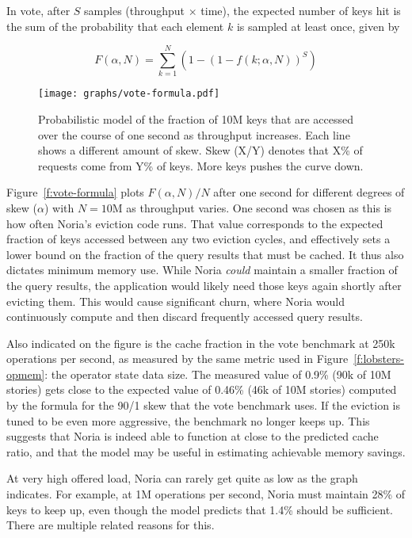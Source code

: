 In vote, after $S$ samples (throughput $\times$ time), the expected number of
keys hit is the sum of the probability that each element $k$ is sampled at least
once, given by

\begin{displaymath}
  F(\alpha,N)={\sum \limits _{k=1}^{N} \left(1 - \left(1 - f(k; \alpha, N)\right)^{S}\right)}
\end{displaymath}

\begin{figure}[h]
  \centering
  \texttt{[image: graphs/vote-formula.pdf]}
  \caption{Probabilistic model of the fraction of 10M keys that are accessed
  over the course of one second as throughput increases. Each line shows a
  different amount of skew. Skew (X/Y) denotes that X\% of requests come from
  Y\% of keys. More keys pushes the curve down.}
  \label{f:vote-formula}
\end{figure}

Figure~\vref{f:vote-formula} plots $F(\alpha, N)/N$ after one second for
different degrees of skew ($\alpha$) with $N=10\text{M}$ as throughput varies.
One second was chosen as this is how often Noria's eviction code runs. That
value corresponds to the expected fraction of keys accessed between any two
eviction cycles, and effectively sets a lower bound on the fraction of the query
results that must be cached. It thus also dictates minimum memory use. While
Noria \emph{could} maintain a smaller fraction of the query results, the
application would likely need those keys again shortly after evicting them. This
would cause significant churn, where Noria would continuously compute and then
discard frequently accessed query results.

Also indicated on the figure is the cache fraction in the vote benchmark at 250k
operations per second, as measured by the same metric used in
Figure~\ref{f:lobsters-opmem}: the operator state data size. The measured value
of 0.9\% (90k of 10M stories) gets close to the expected value of 0.46\% (46k
of 10M stories) computed by the formula for the 90/1 skew that the vote
benchmark uses. If the eviction is tuned to be even more aggressive, the
benchmark no longer keeps up. This suggests that Noria is indeed able to
function at close to the predicted cache ratio, and that the model may be useful
in estimating achievable memory savings.

At very high offered load, Noria can rarely get quite as low as the graph
indicates. For example, at 1M operations per second, Noria must maintain 28\% of
keys to keep up, even though the model predicts that 1.4\% should be sufficient.
There are multiple related reasons for this.

